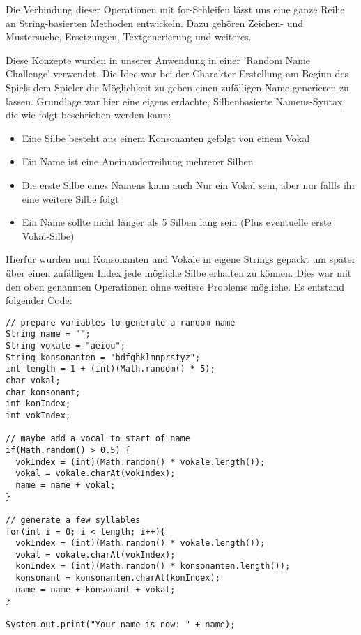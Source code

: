 Die Verbindung dieser Operationen mit for-Schleifen lässt uns eine ganze Reihe an String-basierten Methoden entwickeln. Dazu gehören Zeichen- und Mustersuche, Ersetzungen, Textgenerierung und weiteres.

Diese Konzepte wurden in unserer Anwendung in einer 'Random Name Challenge' verwendet. Die Idee war bei der Charakter Erstellung am Beginn des Spiels dem Spieler die Möglichkeit zu geben einen zufälligen Name generieren zu lassen. Grundlage war hier eine eigens erdachte, Silbenbasierte Namens-Syntax, die wie folgt beschrieben werden kann:
\begin{itemize}
	\item Eine Silbe besteht aus einem Konsonanten gefolgt von einem Vokal
	\item Ein Name ist eine Aneinanderreihung mehrerer Silben
	\item Die erste Silbe eines Namens kann auch Nur ein Vokal sein, aber nur fallls ihr eine weitere Silbe folgt
	\item Ein Name sollte nicht länger als 5 Silben lang sein (Plus eventuelle erste Vokal-Silbe)
\end{itemize}
Hierfür wurden nun Konsonanten und Vokale in eigene Strings gepackt um später über einen zufälligen Index jede mögliche Silbe erhalten zu können. Dies war mit den oben genannten Operationen ohne weitere Probleme mögliche. Es entstand folgender Code:
\begin{verbatim}
// prepare variables to generate a random name
String name = "";
String vokale = "aeiou";
String konsonanten = "bdfghklmnprstyz";
int length = 1 + (int)(Math.random() * 5);
char vokal;
char konsonant;
int konIndex;
int vokIndex;

// maybe add a vocal to start of name
if(Math.random() > 0.5) {
  vokIndex = (int)(Math.random() * vokale.length());
  vokal = vokale.charAt(vokIndex);
  name = name + vokal;
}

// generate a few syllables
for(int i = 0; i < length; i++){
  vokIndex = (int)(Math.random() * vokale.length());
  vokal = vokale.charAt(vokIndex);
  konIndex = (int)(Math.random() * konsonanten.length());
  konsonant = konsonanten.charAt(konIndex);
  name = name + konsonant + vokal;
}

System.out.print("Your name is now: " + name);
\end{verbatim}


